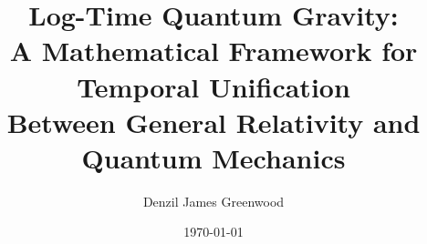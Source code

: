 \documentclass[11pt]{article}
\title{\vspace{-1em}%
Log-Time Quantum Gravity: \\
A Mathematical Framework for Temporal Unification \\
Between General Relativity and Quantum Mechanics}
\author[1]{Denzil James Greenwood}
\affil[1]{Independent Research}
\date{\today}
\theoremstyle{definition}
\theoremstyle{remark}
\begin{document}
\maketitle



\tableofcontents
\clearpage











\nocite{*}






\appendix


\end{document}
